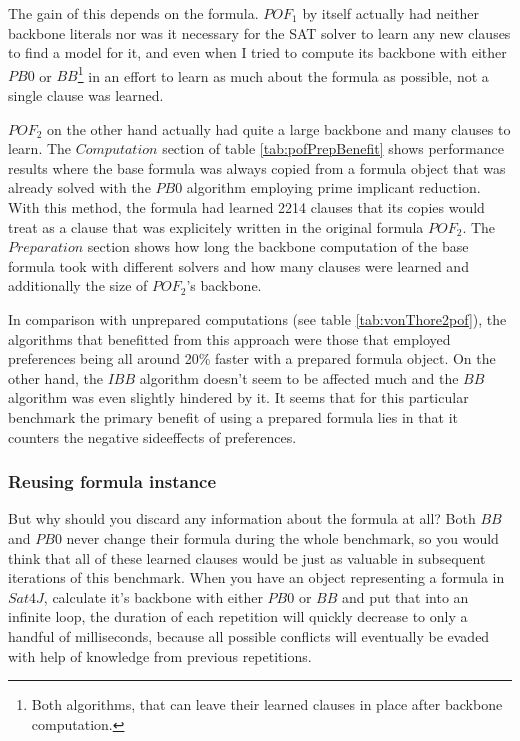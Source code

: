 The gain of this depends on the formula. $POF_1$ by itself actually had neither backbone literals %
nor was it necessary for the SAT solver to learn any new clauses to find a model for it, and even when I tried to compute its backbone with either $PB0$ or $BB$\footnote{Both algorithms, that can leave their learned clauses in place after backbone computation.} in an effort to learn as much about the formula as possible, not a single clause was learned.

$POF_2$ on the other hand actually had quite a large backbone and many clauses to learn. The $Computation$ section of table \ref{tab:pofPrepBenefit} shows performance results where the base formula was always copied from a formula object that was already solved with the $PB0$ algorithm employing prime implicant reduction. With this method, the formula had learned 2214 clauses that its copies would treat as a clause that was explicitely written in the original formula $POF_2$. The $Preparation$ section shows how long the backbone computation of the base formula took with different solvers and how many clauses were learned and additionally the size of $POF_2$'s backbone.

In comparison with unprepared computations (see table \ref{tab:vonThore2pof}), the algorithms that benefitted from this approach were those that employed preferences being all around 20\% faster with a prepared formula object. On the other hand, the $IBB$ algorithm doesn't seem to be affected much and the $BB$ algorithm was even slightly hindered by it. It seems that for this particular benchmark the primary benefit of using a prepared formula lies in that it counters the negative sideeffects of preferences.




\subsubsection{Reusing formula instance}
But why should you discard any information about the formula at all? Both $BB$ and $PB0$ never change their formula during the whole benchmark, so you would think that all of these learned clauses would be just as valuable in subsequent iterations of this benchmark. When you have an object representing a formula in $Sat4J$, calculate it's backbone with either $PB0$ or $BB$ and put that into an infinite loop, the duration of each repetition will quickly decrease to only a handful of milliseconds, because all possible conflicts will eventually be evaded with help of knowledge from previous repetitions.

